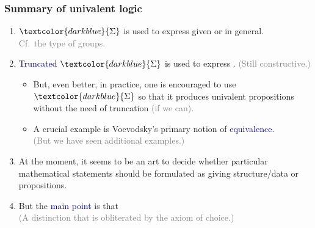 \documentclass[aspectratio=169]{beamer}
\newcommand{\db}{\textcolor{darkblue}}
\newcommand{\grey}{\textcolor{grey}}
\newcommand{\m}[1]{$\db{#1}$}
\begin{document}
\begin{frame}
  \frametitle{Summary of univalent logic}

  \begin{enumerate}
  \vfill \item \m{\Sigma} is used to express given  or  in general. \\[1ex]
\grey{Cf.\ the type of groups.}

  \vfill \item \db{Truncated} \m{\Sigma} is used to express . \grey{(Still constructive.)}
    \begin{itemize}
    \vfill \item But, even better, in practice, one is encouraged to use \m{\Sigma} so that it produces univalent propositions without the need of truncation \grey{(if we can).}
\vfill \item
A crucial example is Voevodsky's primary notion of \db{equivalence}. \\[1ex]
\grey{(But we have seen additional examples.)}
    \end{itemize}
\vfill \item At the moment, it seems to be an art to decide whether  particular mathematical statements should be formulated as giving structure/data or propositions.
\vfill \item But the \db{main point} is that  \\[1ex]

\grey{(A distinction that is obliterated by the axiom of choice.)}

  \end{enumerate}

\end{frame}
\end{document}
